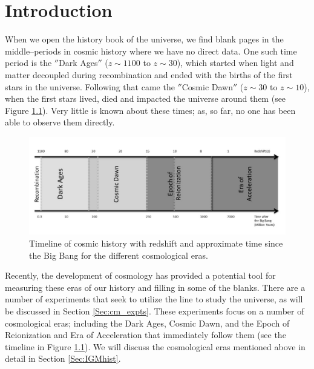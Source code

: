 \chapter{Introduction}\label{Ch:Intro}

When we open the history book of the universe, we find blank pages in the middle--periods in cosmic history where we have no direct data. One such time period is the $''$Dark Ages$''$ ($z \sim 1100$ to $z \sim 30$), which started when light and matter decoupled during recombination and ended with the births of the first stars in the universe. Following that came the $''$Cosmic Dawn$''$ ($z\sim 30$ to $z\sim 10$), when the first stars lived, died and impacted the universe around them (see Figure \ref{Fig:hist}). Very little is known about these times; as, so far, no one has been able to observe them directly. 

\begin{figure}[htb]
\begin{center}
\includegraphics[width=0.95\linewidth]{Introduction/figures/timeline.jpg}
\caption{Timeline of cosmic history with redshift and approximate time since the Big Bang for the different cosmological eras. }
\label{Fig:hist}
\end{center}
\end{figure}

Recently, the development of \cm cosmology has provided a potential tool for measuring these eras of our history and filling in some of the blanks. There are a number of experiments that seek to utilize the \cm line to study the universe, as will be discussed in Section \ref{Sec:cm_expts}. These experiments focus on a number of cosmological eras; including the Dark Ages, Cosmic Dawn, and the Epoch of Reionization and Era of Acceleration that immediately follow them (see the timeline in Figure \ref{Fig:hist}). We will discuss the cosmological eras mentioned above in detail in Section \ref{Sec:IGMhist}.

